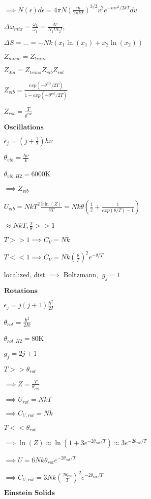 \documentclass{article}
\begin{document}
\begin{multicols}{3}
$\implies N(\epsilon)d\epsilon=4\pi N \left (\frac{m}{2\pi kT} \right )^{3/2} v^2 e^{-mv^2 /2kT}dv$

$\Delta\omega_{mix}=\frac{\omega_2}{\omega_1}=\frac{N!}{N_1! N_2!}$,

$\Delta S=...=-Nk(x_1 \ln(x_1) + x_2 \ln(x_2) )$

$Z_{mono}=Z_{trans}$

$Z_{dia }=Z_{trans}Z_{vib}Z_{rot}$

$Z_{vib }=\frac{exp(-\theta^{vib}/2T)}{1-exp(-\theta^{vib}/2T)}$

$Z_{rot }=\frac{T}{\theta^{rot}}$

$\textbf{Oscillations}$

$\epsilon_j=(j+\frac{1}{2})h\nu$

$\theta_{vib}=\frac{h\nu}{k}$

$\theta_{vib,H2}=6000$K

$\implies Z_{vib}$

$U_{vib}=NkT^2\frac{\partial \ln(Z)}{\partial T}=Nk\theta(\frac{1}{2}+\frac{1}{exp(\theta/T)-1})$

$\approx NkT, \frac{T}{\theta}>>1$

$T>>1 \implies C_V=Nk$

$T<<1 \implies C_V=Nk(\frac{\theta}{T})^2 e^{-\theta/T}$

localized, dist $\implies$ Boltzmann, $\:g_j=1$

$\textbf{Rotations}$

$\epsilon_j=j(j+1)\frac{\hbar^2}{2I}$

$\theta_{rot}=\frac{\hbar^2}{2Ik}$

$\theta_{rot,H2}=80$K

$g_j=2j+1$

$T>>\theta_{rot}$

$\implies Z=\frac{T}{\theta_{rot}}$

$\implies U_{rot}=NkT$

$\implies C_{V,rot}=Nk$

$T<<\theta_{rot}$

$\implies \ln(Z)\approx \ln(1+3e^{-2\theta_{rot}/T})\approx 3e^{-2\theta_{rot}/T}$

$\implies U=6Nk\theta_{rot}e^{-2\theta_{rot}/T}$

$\implies C_{V,rot}=3Nk(\frac{2\theta_{rot}}{T})^2 e^{-2\theta_{rot}/T}$

$\textbf{Einstein Solids}$


\end{multicols}
\end{document}
